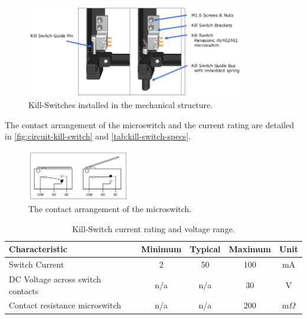 \begin{figure}[!ht]
    \begin{center}
        \includegraphics[width=0.85\textwidth]{figures/kill-switch-installed}
        \caption{Kill-Switches installed in the mechanical structure.}
        \label{fig:kill-switch-installed}
    \end{center}
\end{figure}

The contact arrangement of the microswitch and the current rating are detailed in \autoref{fig:circuit-kill-switch} and \autoref{tab:kill-switch-specs}.

\begin{figure}[!ht]
    \begin{center}
        \includegraphics[width=0.4\textwidth]{figures/circuit-kill-switch}
        \caption{The contact arrangement of the microswitch.}
        \label{fig:circuit-kill-switch}
    \end{center}
\end{figure}

\begin{table}[!h]
    \centering
    \begin{tabular}{lcccc}
        \toprule[1.5pt]
        \textbf{Characteristic} & \textbf{Minimum} & \textbf{Typical} & \textbf{Maximum} & \textbf{Unit} \\
        \midrule
        Switch Current                      & 2     & 50    & 100   & mA \\
        DC Voltage across switch contacts   & n/a   & n/a   & 30    & V \\
        Contact resistance microswitch      & n/a   & n/a   & 200   & m$\Omega$ \\
        \bottomrule[1.5pt]
    \end{tabular}
    \caption{Kill-Switch current rating and voltage range.}
    \label{tab:kill-switch-specs}
\end{table}

